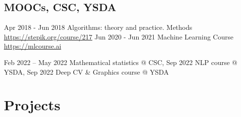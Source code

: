\documentclass[11pt,a4paper]{moderncv}
\begin{document}
\subsection{MOOCs, CSC, YSDA}
\cventry
{Apr 2018 - Jun 2018}
{Algorithms: theory and practice. Methods}
{}
{}{\newline\url{https://stepik.org/course/217}}{}
\cventry
{Jun 2020 - Jun 2021}
{Machine Learning Course}
{}
{}{\newline\url{https://mlcourse.ai}}{}

\cventry
{Feb 2022 -- May 2022}
{Mathematical statistics @ CSC,}
{}
{}{}{}
\cventry
{Sep 2022}
{NLP course @ YSDA,}
{}
{}{}{}
\cventry
{Sep 2022}
{Deep CV \& Graphics course @ YSDA}
{}
{}{}{}









\pagebreak
\section{Projects}
\end{document}
